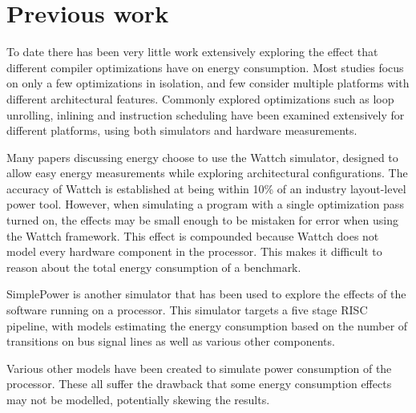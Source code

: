\documentclass[twocolumn]{article}
\begin{document}

\section{Previous work}

To date there has been very little work extensively exploring the effect that different compiler optimizations have on energy consumption. Most studies focus on only a few optimizations in isolation, and few consider multiple platforms with different architectural features. Commonly explored optimizations such as loop unrolling, inlining and instruction scheduling have been examined extensively for different platforms, using both simulators and hardware measurements\cite{EffectOfCompilerOptimizationsOnPentium4}.

Many papers discussing energy choose to use the Wattch simulator\cite{Wattch}, designed to allow easy energy measurements while exploring architectural configurations. The accuracy of Wattch is established at being within 10\% of an industry layout-level power tool. However, when simulating a program with a single optimization pass turned on, the effects may be small enough to be mistaken for error when using the Wattch framework. This effect is compounded because Wattch does not model every hardware component in the processor. This makes it difficult to reason about the total energy consumption of a benchmark.

SimplePower\cite{SimplePower} is another simulator that has been used to explore the effects of the software running on a processor. This simulator targets a five stage RISC pipeline, with models estimating the energy consumption based on the number of transitions on bus signal lines as well as various other components.

Various other models have been created to simulate power consumption of the processor\cite{Park2011,Schneider2005}. These all suffer the drawback that some energy consumption effects may not be modelled, potentially skewing the results.
\end{document}
